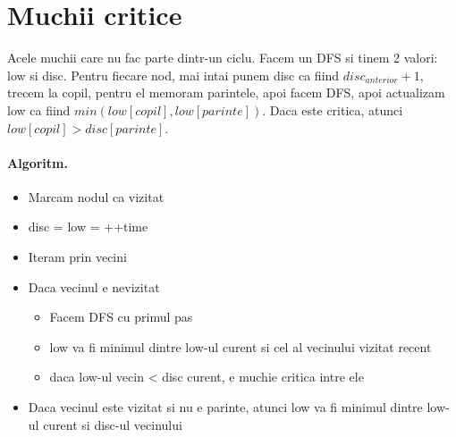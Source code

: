 \documentclass{article}
\begin{document}
\section{Muchii critice} Acele muchii care nu fac parte dintr-un ciclu. Facem un DFS si tinem 2 valori: low si disc. Pentru fiecare nod, mai intai punem disc ca fiind $disc_{anterior} + 1$, trecem la copil, pentru el memoram parintele, apoi facem DFS, apoi actualizam low ca fiind $min(low[copil], low[parinte])$. Daca este critica, atunci $low[copil]>disc[parinte]$.
\paragraph*{Algoritm.}
\begin{itemize}
    \item Marcam nodul ca vizitat
    \item disc = low = ++time
    \item Iteram prin vecini
    \item Daca vecinul e nevizitat
          \begin{itemize}
              \item Facem DFS cu primul pas
              \item low va fi minimul dintre low-ul curent si cel al vecinului vizitat recent
              \item daca low-ul vecin < disc curent, e muchie critica intre ele
          \end{itemize}
    \item Daca vecinul este vizitat si nu e parinte, atunci low va fi minimul dintre low-ul curent si disc-ul vecinului
\end{itemize}
\end{document}
